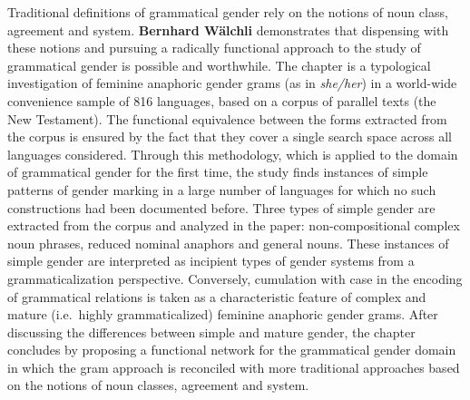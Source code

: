 \documentclass[output=collectionpaper]{langsci/langscibook}
\begin{document}
Traditional definitions of grammatical gender rely on the notions of noun class, agreement and system. \textbf{Bernhard Wälchli} demonstrates that dispensing with these notions and pursuing a radically functional approach to the study of grammatical gender is possible and worthwhile. The chapter is a typological investigation of feminine anaphoric gender grams (as in  \textit{she/her}) in a world-wide convenience sample of 816 languages, based on a corpus of parallel texts (the New Testament). The functional equivalence between the forms extracted from the corpus is ensured by the fact that they cover a single search space across all languages considered. Through this methodology, which is applied to the domain of grammatical gender for the first time, the study finds instances of simple patterns of gender marking in a large number of languages for which no such constructions had been documented before. Three types of simple gender are extracted from the corpus and analyzed in the paper: non-compositional complex noun phrases, reduced nominal anaphors and general nouns. These instances of simple gender are interpreted as incipient types of gender systems from a grammaticalization perspective. Conversely, cumulation with case in the encoding of grammatical relations is taken as a characteristic feature of complex and mature (i.e.\ highly grammaticalized) feminine anaphoric gender grams. After discussing the differences between simple and mature gender, the chapter concludes by proposing a functional network for the grammatical gender domain in which the gram approach is reconciled with more traditional approaches based on the notions of noun classes, agreement and system.
\end{document}
